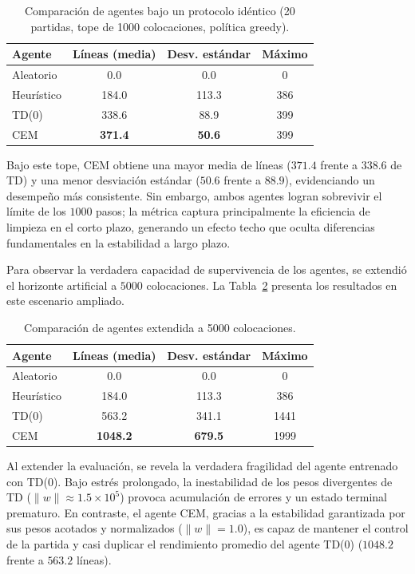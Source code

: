 \begin{table}[h]
\centering
\small
\caption{Comparación de agentes bajo un protocolo idéntico (20 partidas, tope de 1000 colocaciones, política greedy).}
\label{tab:comparacion_1000}
\begin{tabular}{lccc}
\hline
Agente & Líneas (media) & Desv. estándar & Máximo \\
\hline
Aleatorio  & 0.0            & 0.0           & 0   \\
Heurístico & 184.0          & 113.3         & 386 \\
TD(0)      & 338.6          & 88.9          & 399 \\
CEM        & \textbf{371.4} & \textbf{50.6} & 399 \\
\hline
\end{tabular}
\end{table}

Bajo este tope, CEM obtiene una mayor media de líneas ($371.4$ frente a $338.6$ de TD) y una menor desviación estándar ($50.6$ frente a $88.9$), evidenciando un desempeño más consistente. Sin embargo, ambos agentes logran sobrevivir el límite de los $1000$ pasos; la métrica captura principalmente la eficiencia de limpieza en el corto plazo, generando un efecto techo que oculta diferencias fundamentales en la estabilidad a largo plazo.

Para observar la verdadera capacidad de supervivencia de los agentes, se extendió el horizonte artificial a $5000$ colocaciones. La Tabla~\ref{tab:comparacion_5000} presenta los resultados en este escenario ampliado.

\begin{table}[h]
\centering
\small
\caption{Comparación de agentes extendida a 5000 colocaciones.}
\label{tab:comparacion_5000}
\begin{tabular}{lccc}
\hline
Agente & Líneas (media) & Desv. estándar & Máximo \\
\hline
Aleatorio  & 0.0            & 0.0           & 0   \\
Heurístico & 184.0          & 113.3         & 386 \\
TD(0)      & 563.2          & 341.1         & 1441 \\
CEM        & \textbf{1048.2}& \textbf{679.5}& 1999 \\
\hline
\end{tabular}
\end{table}

Al extender la evaluación, se revela la verdadera fragilidad del agente entrenado con TD(0). Bajo estrés prolongado, la inestabilidad de los pesos divergentes de TD ($\lVert w \rVert \approx 1.5 \times 10^{5}$) provoca acumulación de errores y un estado terminal prematuro. En contraste, el agente CEM, gracias a la estabilidad garantizada por sus pesos acotados y normalizados ($\lVert w \rVert = 1.0$), es capaz de mantener el control de la partida y casi duplicar el rendimiento promedio del agente TD(0) ($1048.2$ frente a $563.2$ líneas).

